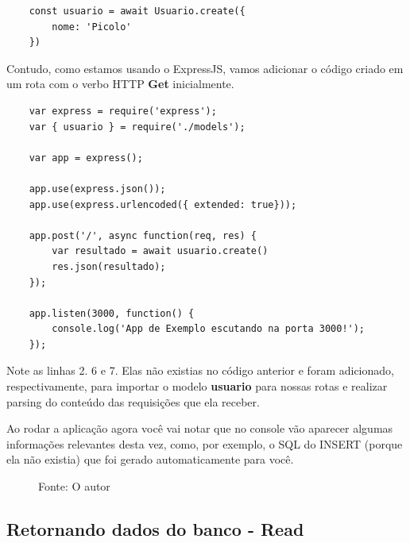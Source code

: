 \newpage

\begin{verbatim}
	const usuario = await Usuario.create({
		nome: 'Picolo'
	})
\end{verbatim}

Contudo, como estamos usando o ExpressJS, vamos adicionar o código criado em um rota com o verbo HTTP \textbf{Get} inicialmente. 

\begin{verbatim}
	var express = require('express');
	var { usuario } = require('./models');
	
	var app = express();
	
	app.use(express.json());
	app.use(express.urlencoded({ extended: true}));
	
	app.post('/', async function(req, res) {
		var resultado = await usuario.create()
		res.json(resultado);
	});
	
	app.listen(3000, function() {
		console.log('App de Exemplo escutando na porta 3000!');
	});
\end{verbatim}

Note as linhas 2. 6 e 7. Elas não existias no código anterior e foram adicionado, respectivamente, para importar o modelo \textbf{usuario} para nossas rotas e realizar parsing do conteúdo das requisições que ela receber. 

Ao rodar a aplicação agora você vai notar que no console vão aparecer algumas informações relevantes desta vez, como, por exemplo, o SQL do INSERT (porque ela não existia) que foi gerado automaticamente para você.

\begin{figure}[H]
	\centering
	\caption{
		Fonte: O autor
	}
	\label{fig:resutadoinset}
\end{figure}

\subsection{Retornando dados do banco - Read}

